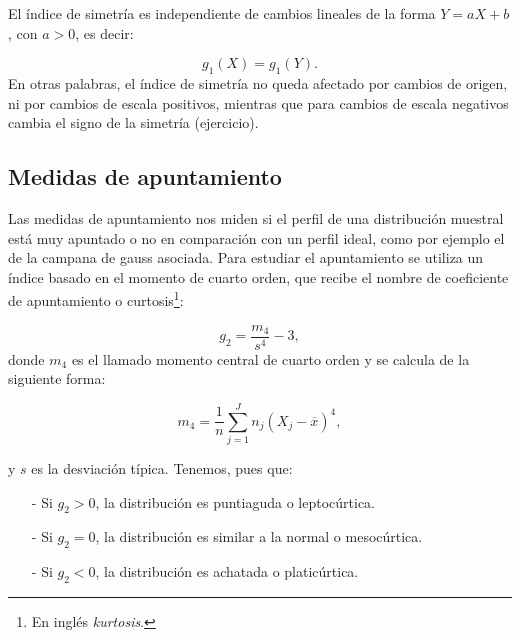 \documentclass[12pt]{report}
\begin{document}
El índice de simetría es independiente de cambios lineales de la forma $Y=aX+b$, con
$a>0$, es decir:

$$g_1(X)=g_1(Y).$$
En otras palabras, el índice de simetría no queda afectado por cambios de origen, ni por
cambios de escala positivos, mientras que para cambios de escala negativos cambia el
signo de la simetría (ejercicio).

\subsection{Medidas de apuntamiento}

Las medidas de apuntamiento nos miden si el perfil de una distribución muestral está muy
apuntado o no en comparación con un perfil ideal, como por ejemplo el de la campana de
gauss asociada. Para estudiar el apuntamiento se utiliza un índice basado en el momento
de cuarto orden, que recibe el nombre de coeficiente de apuntamiento o curtosis\footnote{En inglés \emph{kurtosis}.}:

$$g_2=\frac{m_4}{s^4}-3,$$
donde $m_4$ es el llamado momento central de cuarto orden y se calcula de la
siguiente forma:

$$
m_4 =\frac{1}{n} \sum\limits_{j=1}^{J} n_j(X_j - \overline{x})^4,
$$

y $s$  es la desviación típica. Tenemos, pues  que:
\begin{itemize}
\item[-] Si  $g_2>0$, la distribución
es puntiaguda o leptocúrtica.

\item[-]Si $g_2=0$, la distribución
es similar a la normal o mesocúrtica.

\item[-] Si $g_2<0$, la distribución
es achatada o platicúrtica.
\end{itemize}
\end{document}
